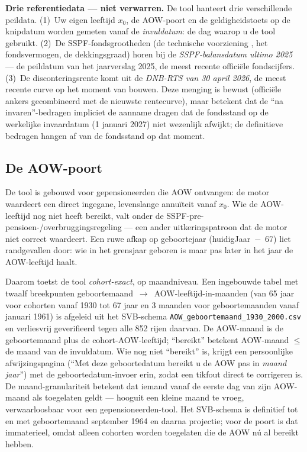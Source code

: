 \documentclass[11pt,a4paper]{article}
\newcommand{\vpvTotal}{\text{vpvTotal}}
\newcommand{\code}[1]{\texttt{#1}}
\begin{document}
\textbf{Drie referentiedata --- niet verwarren.} De tool hanteert drie verschillende peildata. (1)~Uw eigen leeftijd $x_0$, de AOW-poort en de geldigheidstoets op de knipdatum worden gemeten vanaf de \emph{invuldatum}: de dag waarop u de tool gebruikt. (2)~De SSPF-fondsgrootheden (de technische voorziening \vpvTotal, het fondsvermogen, de dekkingsgraad) horen bij de \emph{SSPF-balansdatum ultimo 2025} --- de peildatum van het jaarverslag 2025, de meest recente officiële fondscijfers. (3)~De disconteringsrente komt uit de \emph{DNB-RTS van 30 april 2026}, de meest recente curve op het moment van bouwen. Deze menging is bewust (officiële ankers gecombineerd met de nieuwste rentecurve), maar betekent dat de ``na invaren''-bedragen impliciet de aanname dragen dat de fondsstand op de werkelijke invaardatum (1 januari 2027) niet wezenlijk afwijkt; de definitieve bedragen hangen af van de fondsstand op dat moment.

\subsection{De AOW-poort}
\label{sec:aow-poort}

De tool is gebouwd voor gepensioneerden die AOW ontvangen: de motor waardeert een direct ingegane, levenslange annuïteit vanaf $x_0$. Wie de AOW-leeftijd nog niet heeft bereikt, valt onder de SSPF-pre-pensioen-/overbruggingsregeling --- een ander uitkeringspatroon dat de motor niet correct waardeert. Een ruwe afkap op geboortejaar (huidigJaar~$-$~67) liet randgevallen door: wie in het grensjaar geboren is maar pas later in het jaar de AOW-leeftijd haalt.

Daarom toetst de tool \emph{cohort-exact}, op maandniveau. Een ingebouwde tabel met twaalf breekpunten geboortemaand~$\to$~AOW-leeftijd-in-maanden (van 65 jaar voor cohorten vanaf 1930 tot 67 jaar en 3 maanden voor geboortemaanden vanaf januari 1961) is afgeleid uit het SVB-schema \code{AOW\_geboortemaand\_1930\_2000.csv} en verliesvrij geverifieerd tegen alle 852 rijen daarvan. De AOW-maand is de geboortemaand plus de cohort-AOW-leeftijd; ``bereikt'' betekent AOW-maand $\le$ de maand van de invuldatum. Wie nog niet ``bereikt'' is, krijgt een persoonlijke afwijzingspagina (``Met deze geboortedatum bereikt u de AOW pas in \emph{maand jaar}'') met de geboortedatum-invoer erin, zodat een tikfout direct te corrigeren is. De maand-granulariteit betekent dat iemand vanaf de eerste dag van zijn AOW-maand als toegelaten geldt --- hooguit een kleine maand te vroeg, verwaarloosbaar voor een gepensioneerden-tool. Het SVB-schema is definitief tot en met geboortemaand september 1964 en daarna projectie; voor de poort is dat immaterieel, omdat alleen cohorten worden toegelaten die de AOW nú al bereikt hebben.
\end{document}
